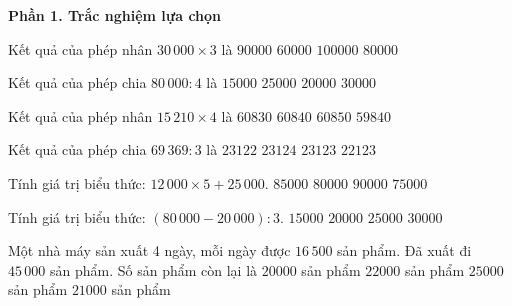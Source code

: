 \textbf{Phần 1. Trắc nghiệm lựa chọn}

\begin{ex} %
Kết quả của phép nhân $30\,000 \times 3$ là
\choice
{\True $90000$}
{$60000$}
{$100000$}
{$80000$}
\end{ex}

\begin{ex} %
Kết quả của phép chia $80\,000 : 4$ là
\choice
{$15000$}
{$25000$}
{\True $20000$}
{$30000$}
\end{ex}

\begin{ex} %
Kết quả của phép nhân $15\,210 \times 4$ là
\choice
{$60830$}
{\True $60840$}
{$60850$}
{$59840$}
\end{ex}

\begin{ex} %
Kết quả của phép chia $69\,369 : 3$ là
\choice
{$23122$}
{$23124$}
{\True $23123$}
{$22123$}
\end{ex}

\begin{ex} %
Tính giá trị biểu thức: $12\,000 \times 5 + 25\,000$.
\choice
{\True $85000$}
{$80000$}
{$90000$}
{$75000$}
\end{ex}

\begin{ex} %
Tính giá trị biểu thức: $(80\,000 - 20\,000) : 3$.
\choice
{$15000$}
{\True $20000$}
{$25000$}
{$30000$}
\end{ex}

\begin{ex} %
Một nhà máy sản xuất 4 ngày, mỗi ngày được $16\,500$ sản phẩm. Đã xuất đi $45\,000$ sản phẩm. Số sản phẩm còn lại là
\choice
{$20000$ sản phẩm}
{$22000$ sản phẩm}
{$25000$ sản phẩm}
{\True $21000$ sản phẩm}
\end{ex}

